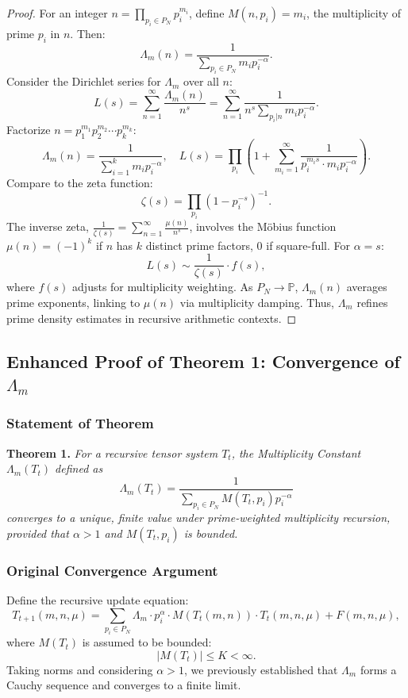 \documentclass[12pt]{article}
\begin{document}
\begin{proof}
For an integer \( n = \prod_{p_i \in P_N} p_i^{m_i} \), define \( M(n, p_i) = m_i \), the multiplicity of prime \( p_i \) in \( n \). Then:
\[
\Lambda_m(n) = \frac{1}{\sum_{p_i \in P_N} m_i p_i^{-\alpha}}.
\]
Consider the Dirichlet series for \(\Lambda_m\) over all \( n \):
\[
L(s) = \sum_{n=1}^\infty \frac{\Lambda_m(n)}{n^s} = \sum_{n=1}^\infty \frac{1}{n^s \sum_{p_i | n} m_i p_i^{-\alpha}}.
\]
Factorize \( n = p_1^{m_1} p_2^{m_2} \cdots p_k^{m_k} \):
\[
\Lambda_m(n) = \frac{1}{\sum_{i=1}^k m_i p_i^{-\alpha}}, \quad L(s) = \prod_{p_i} \left( 1 + \sum_{m_i=1}^\infty \frac{1}{p_i^{m_i s} \cdot m_i p_i^{-\alpha}} \right).
\]
Compare to the zeta function:
\[
\zeta(s) = \prod_{p_i} \left( 1 - p_i^{-s} \right)^{-1}.
\]
The inverse zeta, \(\frac{1}{\zeta(s)} = \sum_{n=1}^\infty \frac{\mu(n)}{n^s}\), involves the M\"{o}bius function \(\mu(n) = (-1)^k\) if \( n \) has \( k \) distinct prime factors, 0 if square-full. For \(\alpha = s\):
\[
L(s) \sim \frac{1}{\zeta(s)} \cdot f(s),
\]
where \( f(s) \) adjusts for multiplicity weighting. As \( P_N \to \mathbb{P} \), \(\Lambda_m(n)\) averages prime exponents, linking to \(\mu(n)\) via multiplicity damping. Thus, \(\Lambda_m\) refines prime density estimates in recursive arithmetic contexts.
\end{proof}

\subsection{Enhanced Proof of Theorem 1: Convergence of \( \Lambda_m \)}

\subsubsection{Statement of Theorem}
\textbf{Theorem 1.} \textit{For a recursive tensor system \( T_t \), the Multiplicity Constant \( \Lambda_m(T_t) \) defined as}
\begin{equation}
    \Lambda_m(T_t) = \frac{1}{\sum_{p_i \in P_N} M(T_t, p_i) p_i^{-\alpha}}
\end{equation}
\textit{converges to a unique, finite value under prime-weighted multiplicity recursion, provided that \( \alpha > 1 \) and \( M(T_t, p_i) \) is bounded.}

\subsubsection{Original Convergence Argument}
Define the recursive update equation:
\begin{equation}
    T_{t+1}(m,n,\mu) = \sum_{p_i \in P_N} \Lambda_m \cdot p_i^\alpha \cdot M(T_t(m,n)) \cdot T_t(m,n,\mu) + F(m,n,\mu),
\end{equation}
where \( M(T_t) \) is assumed to be bounded:
\begin{equation}
    |M(T_t)| \leq K < \infty.
\end{equation}
Taking norms and considering \( \alpha > 1 \), we previously established that \( \Lambda_m \) forms a Cauchy sequence and converges to a finite limit.
\end{document}

